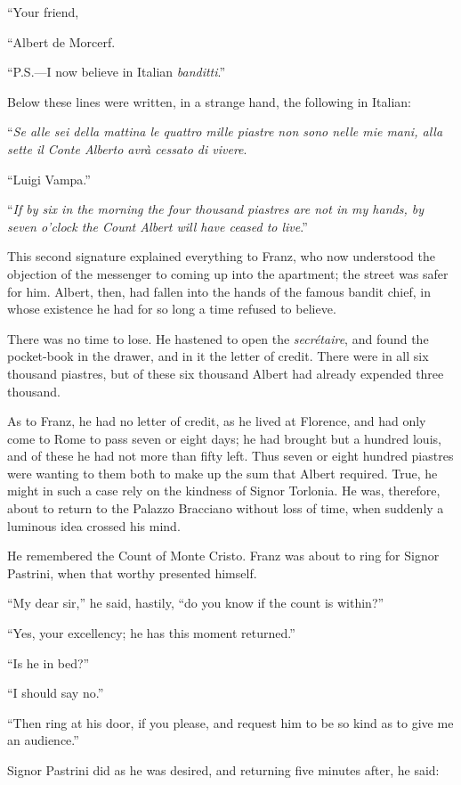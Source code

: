 “Your friend,

“Albert de Morcerf.

“P.S.—I now believe in Italian \textit{banditti}.”

Below these lines were written, in a strange hand, the following in
Italian:

“\textit{Se alle sei della mattina le quattro mille piastre non sono nelle mie
mani, alla sette il Conte Alberto avrà cessato di vivere}.

“Luigi Vampa.”

“\textit{If by six in the morning the four thousand piastres are not in my
hands, by seven o’clock the Count Albert will have ceased to live}.”

This second signature explained everything to Franz, who now understood
the objection of the messenger to coming up into the apartment; the
street was safer for him. Albert, then, had fallen into the hands of
the famous bandit chief, in whose existence he had for so long a time
refused to believe.

There was no time to lose. He hastened to open the \textit{secrétaire}, and
found the pocket-book in the drawer, and in it the letter of credit.
There were in all six thousand piastres, but of these six thousand
Albert had already expended three thousand.

As to Franz, he had no letter of credit, as he lived at Florence, and
had only come to Rome to pass seven or eight days; he had brought but a
hundred louis, and of these he had not more than fifty left. Thus seven
or eight hundred piastres were wanting to them both to make up the sum
that Albert required. True, he might in such a case rely on the
kindness of Signor Torlonia. He was, therefore, about to return to the
Palazzo Bracciano without loss of time, when suddenly a luminous idea
crossed his mind.

He remembered the Count of Monte Cristo. Franz was about to ring for
Signor Pastrini, when that worthy presented himself.

“My dear sir,” he said, hastily, “do you know if the count is within?”

“Yes, your excellency; he has this moment returned.”

“Is he in bed?”

“I should say no.”

“Then ring at his door, if you please, and request him to be so kind as
to give me an audience.”

Signor Pastrini did as he was desired, and returning five minutes
after, he said:

